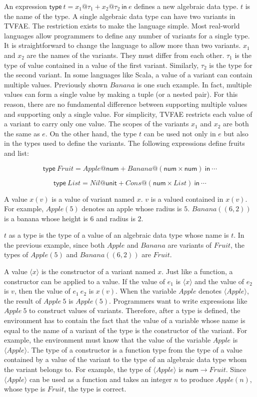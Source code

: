 An expression $\textsf{type}\ t=x_1@\tau_1+x_2@\tau_2\ \textsf{in}\ e$ defines a new
algebraic data type. $t$ is the name of the type. A single algebraic data type
can have two variants in TVFAE. The restriction exists to make the language
simple. Most real-world languages allow programmers to define any number of
variants for a single type. It is straightforward to change the language to
allow more than two variants. $x_1$ and $x_2$ are the names of the variants.
They must differ from each other. $\tau_1$ is the type of value contained in a
value of the first variant. Similarly, $\tau_2$ is the type for the second
variant. In some languages like Scala, a value of a variant can contain multiple
values. Previously shown $Banana$ is one such example. In fact, multiple
values can form a single value by making a tuple (or a nested pair). For this
reason, there are no fundamental difference between supporting multiple values
and supporting only a single value. For simplicity, TVFAE restricts each value
of a variant to carry only one value. The scopes of the variants $x_1$ and
$x_2$ are both the same as $e$. On the other hand, the type $t$ can be
used not only in $e$ but also in the types used to define the variants. The
following expressions define fruits and list:

\[\textsf{type}\
Fruit=Apple@\textsf{num}+Banana@(\textsf{num}\times\textsf{num})\ \textsf{in}\
\cdots\]

\[\textsf{type}\ List=Nil@\textsf{unit}+Cons@(\textsf{num}\times List)\
\textsf{in}\ \cdots\]

A value $x(v)$ is a value of variant named $x$. $v$ is a valued contained
in $x(v)$. For example, $Apple(5)$ denotes an apple whose radius is $5$.
$Banana((6,2))$ is a banana whose height is $6$ and radius is $2$.

$t$ as a type is the type of a value of an algebraic data type whose name is
$t$. In the previous example, since both $Apple$ and $Banana$ are variants
of $Fruit$, the types of $Apple(5)$ and $Banana((6,2))$ are $Fruit$.

A value $\langle x\rangle$ is the constructor of a variant named $x$. Just
like a function, a constructor can be applied to a value. If the value of
$e_1$ is $\langle x\rangle$ and the value of $e_2$ is $v$, then the
value of $e_1\ e_2$ is $x(v)$. When the variable $Apple$ denotes \(\langle
Apple\rangle\), the result of $Apple\ 5$ is $Apple(5)$. Programmers want to
write expressions like $Apple\ 5$ to construct values of variants. Therefore,
after a type is defined, the environment has to contain the fact that the value
of a variable whose name is equal to the name of a variant of the type is the
constructor of the variant. For example, the environment must know that the
value of the variable $Apple$ is $\langle Apple\rangle$. The type of a
constructor is a function type from the type of a value contained by a value of
the variant to the type of an algebraic data type whom the variant belongs to.
For example, the type of $\langle Apple\rangle$ is \(\textsf{num}\rightarrow
Fruit\). Since $\langle Apple\rangle$ can be used as a function and takes an
integer $n$ to produce $Apple(n)$, whose type is $Fruit$, the type is
correct.

